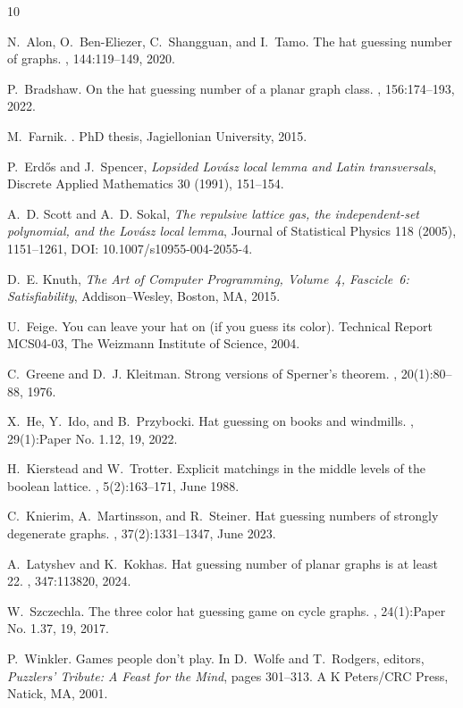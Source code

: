 \documentclass[a4paper,11pt]{amsproc}
\theoremstyle{plain}
\theoremstyle{definition}
\begin{document}
\begin{thebibliography}{10}

N.~Alon, O.~Ben-Eliezer, C.~Shangguan, and I.~Tamo.
\newblock The hat guessing number of graphs.
, 144:119--149, 2020.

P.~Bradshaw.
\newblock On the hat guessing number of a planar graph class.
, 156:174--193, 2022.

M.~Farnik.
.
\newblock PhD thesis, Jagiellonian University, 2015.



P.~Erd\H{o}s and J.~Spencer,
\emph{Lopsided Lov\'{a}sz local lemma and Latin transversals},
Discrete Applied Mathematics 30 (1991), 151--154.

A.~D. Scott and A.~D. Sokal,
\emph{The repulsive lattice gas, the independent-set polynomial, and the
Lov\'{a}sz local lemma},
Journal of Statistical Physics 118 (2005), 1151--1261,
DOI: 10.1007/s10955-004-2055-4.

D.~E. Knuth,
\emph{The Art of Computer Programming, Volume~4, Fascicle~6:
Satisfiability},
Addison--Wesley, Boston, MA, 2015.




U.~Feige.
\newblock You can leave your hat on (if you guess its color).
\newblock Technical Report MCS04-03, The Weizmann Institute of Science, 2004.

C.~Greene and D.~J. Kleitman.
\newblock Strong versions of {S}perner's theorem.
, 20(1):80--88, 1976.

X.~He, Y.~Ido, and B.~Przybocki.
\newblock Hat guessing on books and windmills.
, 29(1):Paper No. 1.12, 19, 2022.

H.~Kierstead and W.~Trotter.
\newblock Explicit matchings in the middle levels of the boolean lattice.
, 5(2):163--171, June 1988.

C.~Knierim, A.~Martinsson, and R.~Steiner.
\newblock Hat guessing numbers of strongly degenerate graphs.
, 37(2):1331--1347, June 2023.

A.~Latyshev and K.~Kokhas.
\newblock Hat guessing number of planar graphs is at least 22.
, 347:113820, 2024.

W.~Szczechla.
\newblock The three color hat guessing game on cycle graphs.
, 24(1):Paper No. 1.37, 19, 2017.

P.~Winkler.
\newblock Games people don't play.
\newblock In D.~Wolfe and T.~Rodgers, editors, {\em Puzzlers' Tribute: A Feast for the Mind}, pages 301--313. A K Peters/CRC Press, Natick, MA, 2001.

\end{thebibliography}
\end{document}
